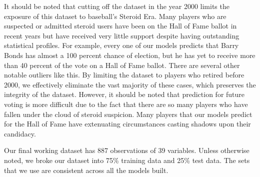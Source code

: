 \documentclass[letterpaper, 10 pt, conference]{ieeeconf}
\begin{document}
It should be noted that cutting off the dataset in the year 2000 limits the exposure of this dataset to baseball's Steroid Era. Many players who are suspected or admitted steroid users have been on the Hall of Fame ballot in recent years but have received very little support despite having outstanding statistical profiles. For example, every one of our models predicts that Barry Bonds has almost a 100 percent chance of election, but he has yet to receive more than 40 percent of the vote on a Hall of Fame ballot. There are several other notable outliers like this. By limiting the dataset to players who retired before 2000, we effectively eliminate the vast majority of these cases, which preserves the integrity of the dataset. However, it should be noted that prediction for future voting is more difficult due to the fact that there are so many players who have fallen under the cloud of steroid suspicion. Many players that our models predict for the Hall of Fame have extenuating circumstances casting shadows upon their candidacy.  

Our final working dataset has 887 observations of 39 variables. Unless otherwise noted, we broke our dataset into 75\% training data and 25\% test data. The sets that we use are consistent across all the models built.
\end{document}
